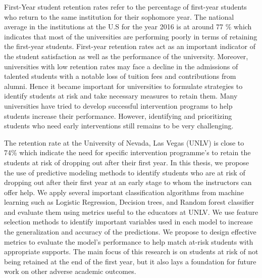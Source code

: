 \documentclass[11pt,openright]{report}
\begin{document}
\thesistitlepage
\copyrightpage

\newpage

\electronicapprovalpage


\begin{thesisabstract}
First-Year student retention rates refer to the percentage of first-year students who return to the same institution for their sophomore year. The national average in the institutions at the U.S for the year 2016 is at around 77 \% which indicates that most of the universities are performing poorly in terms of retaining the first-year students. First-year retention rates act as an important indicator of the student satisfaction as well as the performance of the university. Moreover, universities with low retention rates may face a decline in the admissions of talented students with a notable loss of tuition fees and contributions from alumni. Hence it became important for universities to formulate strategies to identify students at risk and take necessary measures to retain them. Many universities have tried to develop successful intervention programs to help students increase their performance. However, identifying and prioritizing students who need early interventions still remains to be very challenging.  

The retention rate at the University of Nevada, Las Vegas (UNLV) is close to 74\% which indicate the need for specific intervention programme's to retain the students at risk of dropping out after their first year. In this thesis, we propose the use of predictive modeling methods to identify students who are at risk of dropping out after their first year at an early stage to whom the instructors can offer help. We apply several important classification algorithms from machine learning such as Logistic Regression, Decision trees, and Random forest classifier and evaluate them using metrics useful to the educators at UNLV. We use feature selection methods to identify important variables used in each model to increase the generalization and accuracy of the predictions. We propose to design effective metrics to evaluate the model's performance to help match at-risk students with appropriate supports. The main focus of this research is on students at risk of not being retained at the end of the first year, but it also lays a foundation for future work on other adverse academic outcomes. 
\end{thesisabstract}
\end{document}
